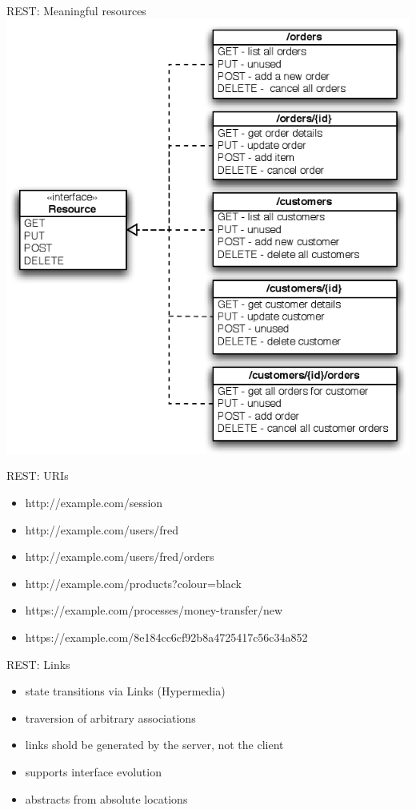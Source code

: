 \documentclass{beamer}
\begin{document}
\begin{frame}{REST: Meaningful resources}
  \includegraphics[height=\textheight]{images/rest_example.png}
\end{frame}

\begin{frame}{REST: URIs}

  \begin{itemize}
    \item http://example.com/session
    \item http://example.com/users/fred
    \item http://example.com/users/fred/orders
    \item http://example.com/products?colour=black
    \item https://example.com/processes/money-transfer/new
    \item https://example.com/8e184cc6cf92b8a4725417c56c34a852
  \end{itemize}
\end{frame}

\begin{frame}{REST: Links}

  \begin{itemize}
    \item state transitions via Links (Hypermedia)
    \item traversion of arbitrary associations
    \item links shold be generated by the server, not the client
    \item supports interface evolution
    \item abstracts from absolute locations
  \end{itemize}
\end{frame}
\end{document}
